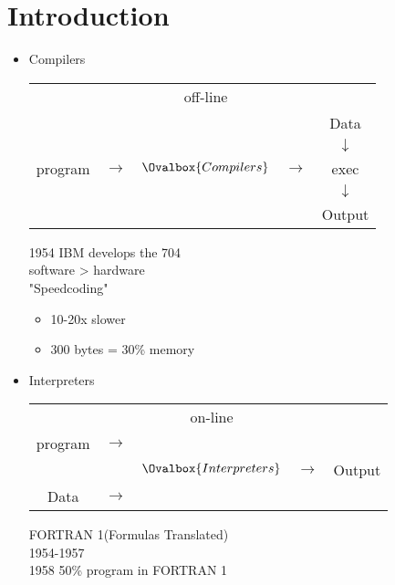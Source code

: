 \documentclass[11pt]{report}
\newenvironment{cell}{%
	\tcolorbox[blanker,breakable,left=5mm,
	before skip=10pt,after skip=10pt,
	borderline west={1mm}{0pt}{stanfordred}]
}%
{\endtcolorbox}
\begin{document}
    \section{Introduction}
    \begin{itemize}
        \item Compilers
            \begin{center}
                \begin{tabular}{c c c c c}
                    & & off-line & & \\
                    & & & & Data \\
                    & & & & \(\downarrow\) \\
                    program & \(\longrightarrow\) & \(\Ovalbox{Compilers}\) & \(\longrightarrow\) & exec \\
                    & & & & \(\downarrow\) \\
                    & & & & Output \\
                \end{tabular}
            \end{center}
            \begin{cell}
                1954 IBM develops the 704 \\
                software > hardware \\
                "Speedcoding"
                \begin{itemize}
                    \item 10-20x slower
                    \item 300 bytes = 30\% memory
                \end{itemize}
            \end{cell}

        \item Interpreters
            \begin{center}
                \begin{tabular}{c c c c c}
                    & & on-line & & \\
                    program & \(\longrightarrow\) & & & \\
                    & & \(\Ovalbox{Interpreters}\) & \(\longrightarrow\) & Output \\
                    Data & \(\longrightarrow\) & & & \\
                \end{tabular}
            \end{center}
            \begin{cell}
                FORTRAN 1(Formulas Translated) \\
                1954-1957 \\
                1958 50\% program in FORTRAN 1
            \end{cell}
    \end{itemize}
\end{document}
